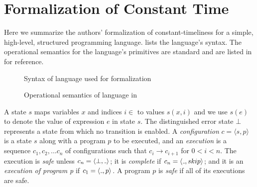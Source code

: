 \section{Formalization of Constant Time}
\label{sec:prelimnaries}


Here we summarize the authors' formalization of constant-timeliness for a simple, high-level, structured programming language. 
 lists the language's syntax. 
The operational semantics for the language's primitives are standard and are listed in  for reference.

\begin{figure}[h!]
\centering
{}
 \caption{Syntax of language used for formalization}
 \label{fig:syntax}
\end{figure}

\begin{figure}[h!]
\centering
{}
 \caption{Operational semantics of language in }
 \label{fig:semantics}
\end{figure}

A state $s$ maps variables $x$ and indices $i \in $ to values $s(x,i)$ and we use $s(e)$ to denote the value of expression $e$ in state $s$. 
The distinguished error state $\bot$ represents a state from which no transition is enabled. A \emph{configuration} $c = \langle s,p \rangle$ is a state $s$ along with a program $p$ to be executed, and an \emph{execution} is a sequence $c_{1},c_{2},...c_{n}$ of configurations such that  $c_{i} \to c_{i+1}$ for $0<i<n$. The execution is \emph{safe} unless $c_{n} = \langle\bot,\mathunderscore\rangle$; it is \emph{complete} if $c_{n} = \langle\mathunderscore,skip\rangle$; and it is an \emph{execution of program p} if $c_{1} = \langle\mathunderscore,p\rangle$. A program $p$ is \emph{safe} if all of its executions are safe. 

